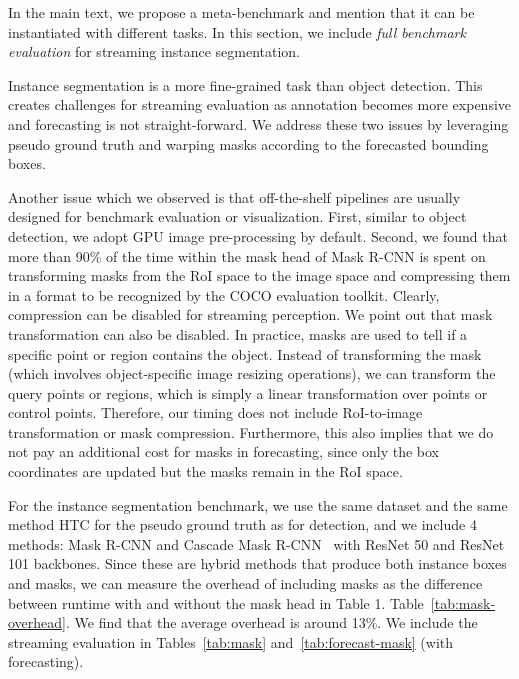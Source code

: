 In the main text, we propose a meta-benchmark and mention that it can be instantiated with different tasks. In this section, we include {\em full benchmark evaluation} for streaming instance segmentation.

Instance segmentation is a more fine-grained task than object detection. This creates challenges for streaming evaluation as annotation becomes more expensive and forecasting is not straight-forward. We address these two issues by leveraging pseudo ground truth and warping masks according to the forecasted bounding boxes.

Another issue which we observed is that off-the-shelf pipelines are usually designed for benchmark evaluation or visualization. First, similar to object detection, we adopt GPU image pre-processing by default. Second, we found that more than 90\% of the time within the mask head of Mask R-CNN is spent on transforming masks from the RoI space to the image space and compressing them in a format to be recognized by the COCO evaluation toolkit. Clearly, compression can be disabled for streaming perception. We point out that mask transformation can also be disabled. In practice, masks are used to tell if a specific point or region contains the object. Instead of transforming the mask (which involves object-specific image resizing operations), we can transform the query points or regions, which is simply a linear transformation over points or control points. Therefore, our timing does not include RoI-to-image transformation or mask compression. Furthermore, this also implies that we do not pay an additional cost for masks in forecasting, since only the box coordinates are updated but the masks remain in the RoI space.

For the instance segmentation benchmark, we use the same dataset and the same method HTC \cite{chen2019hybrid} for the pseudo ground truth as for detection, and we include 4 methods: Mask R-CNN \cite{He2017MaskR}
and Cascade Mask R-CNN~\cite{Cai2018CascadeRD} with ResNet 50 and ResNet 101 backbones. Since these are hybrid methods that produce both instance boxes and masks, we can measure the overhead of including masks as the difference between runtime with and without the mask head in
\ifstandalonesupplement
    Table 1.
\else
    Table~\ref{tab:mask-overhead}.
\fi
We find that the average overhead is around 13\%. We include the streaming evaluation in Tables~\ref{tab:mask} and~\ref{tab:forecast-mask} (with forecasting).


